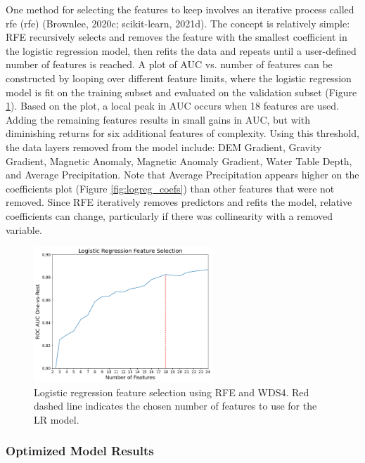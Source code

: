 One method for selecting the features to keep involves an iterative process called \acrlong{rfe} (\acrshort{rfe}) (Brownlee, 2020c; scikit-learn, 2021d). The concept is relatively simple: RFE recursively selects and removes the feature with the smallest coefficient in the logistic regression model, then refits the data and repeats until a user-defined number of features is reached.  A plot of AUC vs. number of features can be constructed by looping over different feature limits, where the logistic regression model is fit on the training subset and evaluated on the validation subset (Figure \ref{fig:logreg_rfe}). Based on the plot, a local peak in AUC occurs when 18 features are used. Adding the remaining features results in small gains in AUC, but with diminishing returns for six additional features of complexity. Using this threshold, the data layers removed from the model include: DEM Gradient, Gravity Gradient, Magnetic Anomaly, Magnetic Anomaly Gradient, Water Table Depth, and Average Precipitation. Note that Average Precipitation appears higher on the coefficients plot (Figure \ref{fig:logreg_coefs}) than other features that were not removed. Since RFE iteratively removes predictors and refits the model, relative coefficients can change, particularly if there was collinearity with a removed variable.

\begin{figure}[!htp]
\centering
\includegraphics[width=0.6\textwidth]{templates/images/Figure-LR_feature_selection.png}
\singlespacing
\caption[Logistic regression feature selection]{Logistic regression feature selection using RFE and WDS4. Red dashed line indicates the chosen number of features to use for the LR model.}
\label{fig:logreg_rfe}
\end{figure}

\newpage 
\subsubsection{Optimized Model Results}\label{ch5:logreg_results}

